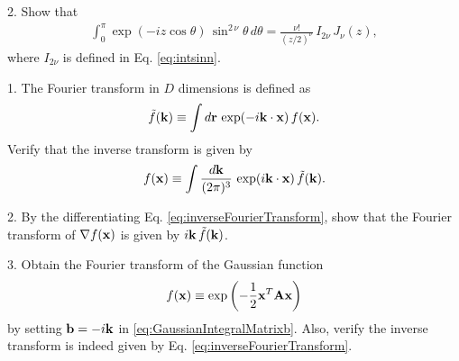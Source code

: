 \documentclass{book}
\begin{document}


2. Show that
\begin{align}
  \int_0^\pi \exp( - i z \cos \theta) \, \sin^{2\,\nu} \theta \, d\theta
=
  \frac{ \nu! }{ (z/2)^\nu } \, I_{2\nu} \, J_\nu(z),
  \label{eq:intexpsin}
\end{align}
where $I_{2\nu}$ is defined in Eq. \eqref{eq:intsinn}.







1. The Fourier transform in $D$ dimensions is defined as
\begin{equation}
  \tilde f(\boldsymbol{\mathbf{k}})
\equiv
  \int d\boldsymbol{\mathbf{r}} \, \exp(-i\boldsymbol{\mathbf{k}} \cdot \boldsymbol{\mathbf{x}}) \, f(\boldsymbol{\mathbf{x}}).
  \label{eq:FourierTransform}
\end{equation}
Verify that the inverse transform is given by
\begin{equation}
  f(\boldsymbol{\mathbf{x}})
\equiv
  \int \frac{ d \boldsymbol{\mathbf{k}} }{(2\pi)^3} \, \exp(i\boldsymbol{\mathbf{k}} \cdot \boldsymbol{\mathbf{x}}) \, \tilde f(\boldsymbol{\mathbf{k}}).
  \label{eq:inverseFourierTransform}
\end{equation}


2. By the differentiating Eq. \eqref{eq:inverseFourierTransform},
show that the Fourier transform of $\nabla f(\boldsymbol{\mathbf{x}})$ is given by $i\boldsymbol{\mathbf{k}} \, \tilde f(\boldsymbol{\mathbf{k}})$.

3. Obtain the Fourier transform of the Gaussian function
\[
  f(\boldsymbol{\mathbf{x}}) \equiv \exp\left( - \frac{1}{2} \boldsymbol{\mathbf{x}}^T \boldsymbol{\mathbf{A}} \boldsymbol{\mathbf{x}} \right)
\]
by setting $\boldsymbol{\mathbf{b}} = -i \boldsymbol{\mathbf{k}}$ in \eqref{eq:GaussianIntegralMatrixb}.
%
Also, verify the inverse transform
is indeed given by Eq. \eqref{eq:inverseFourierTransform}.
\end{document}
